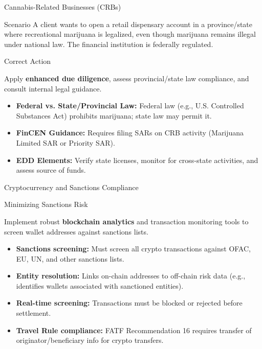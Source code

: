 \documentclass{beamer}
\begin{document}
	\begin{frame}{Cannabis-Related Businesses (CRBs)}
		\begin{block}{Scenario}
			A client wants to open a retail dispensary account in a province/state where recreational marijuana is legalized, even though marijuana remains illegal under national law. The financial institution is federally regulated.
		\end{block}
		\begin{block}{Correct Action}
			\begin{center}
				Apply \textbf{enhanced due diligence}, assess provincial/state law compliance, and consult internal legal guidance.
			\end{center}
		\end{block}
		\begin{itemize}
			\item \textbf{Federal vs. State/Provincial Law:} Federal law (e.g., U.S. Controlled Substances Act) prohibits marijuana; state law may permit it.
			\item \textbf{FinCEN Guidance:} Requires filing SARs on CRB activity (Marijuana Limited SAR or Priority SAR).
			\item \textbf{EDD Elements:} Verify state licenses, monitor for cross-state activities, and assess source of funds.
		\end{itemize}
	\end{frame}
	
	\begin{frame}{Cryptocurrency and Sanctions Compliance}
		\begin{block}{Minimizing Sanctions Risk}
			\begin{center}
				Implement robust \textbf{blockchain analytics} and transaction monitoring tools to screen wallet addresses against sanctions lists.
			\end{center}
		\end{block}
		\begin{itemize}
			\item \textbf{Sanctions screening:} Must screen all crypto transactions against OFAC, EU, UN, and other sanctions lists.
			\item \textbf{Entity resolution:} Links on-chain addresses to off-chain risk data (e.g., identifies wallets associated with sanctioned entities).
			\item \textbf{Real-time screening:} Transactions must be blocked or rejected before settlement.
			\item \textbf{Travel Rule compliance:} FATF Recommendation 16 requires transfer of originator/beneficiary info for crypto transfers.
		\end{itemize}
	\end{frame}
	
\end{document}
